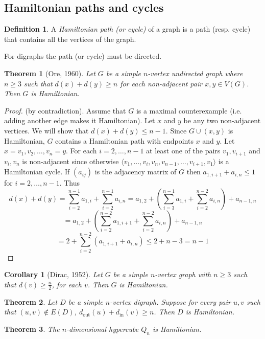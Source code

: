 \documentclass{article}
\newtheorem*{thm}{Theorem}
\newtheorem*{cor}{Corollary}
\theoremstyle{definition}
\newtheorem*{defn}{Definition}
\begin{document}
\subsection{Hamiltonian paths and cycles}

\begin{defn}
A \emph{Hamiltonian path (or cycle)} of a graph is a path (resp. cycle) that contains all the vertices of the graph.
\end{defn}

For digraphs the path (or cycle) must be directed.

\begin{thm}[Ore, 1960]
Let $G$ be a simple $n$-vertex undirected graph where $n\ge 3$ such that $d(x) + d(y) \ge n$ for each non-adjacent pair $x,y\in V(G)$.
Then $G$ is Hamiltonian.
\end{thm}

\begin{proof}
(by contradiction).
Assume that $G$ is a maximal counterexample (i.e. adding another edge makes it Hamiltonian).
Let $x$ and $y$ be any two non-adjacent vertices.
We will show that $d(x) + d(y)  \le n-1$.
Since $G\cup (x,y)$ is Hamiltonian, $G$ contains a Hamiltonian path with endpoints $x$ and $y$.
Let $x = v_1,v_2,\ldots,v_n=y$.
For each $i=2,\ldots,n-1$ at least one of the pairs $v_1,v_{i+1}$ and $v_i,v_n$ is non-adjacent since otherwise $\langle v_1,\ldots,v_i,v_n,v_{n-1},\ldots,v_{i+1},v_1\rangle$ is a Hamiltonian cycle.
If $(a_{ij})$ is the adjacency matrix of $G$ then $a_{1,i+1} + a_{i,n}\le 1$ for $i=2,\ldots,n-1$.
Thus
$$d(x)+d(y) = \sum_{i=2}^{n-1}a_{1,i} + \sum_{i=2}^{n-1} a_{i,n} = a_{1,2}+(\sum_{i=3}^{n-1}a_{1,i} + \sum_{i=2}^{n-2} a_{i,n}) + a_{n-1,n} $$
$$= a_{1,2}+(\sum_{i=2}^{n-2}a_{1,i+1} + \sum_{i=2}^{n-2} a_{i,n}) + a_{n-1,n} $$
$$= 2 + \sum_{i=2}^{n-2}(a_{1,i+1} +a_{i,n}) \le 2+n-3 = n-1$$
\end{proof}

\begin{cor}[Dirac, 1952]
Let $G$ be a simple $n$-vertex graph with $n\ge 3$ such that $d(v) \ge \frac{n}{2}$, for each $v$.
Then $G$ is Hamiltonian.
\end{cor}

\begin{thm}
Let $D$ be a simple $n$-vertex digraph.
Suppose for every pair $u,v$ such that $(u,v)\not\in E(D)$, $d_{\text{out}}(u) + d_{\text{in}}(v) \ge n$.
Then $D$ is Hamiltonian.
\end{thm}

\begin{thm}
The $n$-dimensional hypercube $Q_n$ is Hamiltonian.
\end{thm}
\end{document}
